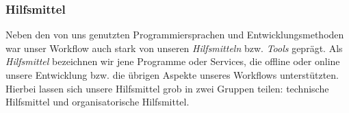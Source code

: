 
\subsubsection{Hilfsmittel}
\label{team:orga-workflow-tools}

Neben den von uns genutzten Programmiersprachen und Entwicklungsmethoden war
unser Workflow auch stark von unseren \emph{Hilfsmitteln} bzw. \emph{Tools}
geprägt. Als \emph{Hilfsmittel} bezeichnen wir jene Programme oder Services, die
offline oder online unsere Entwicklung bzw. die übrigen Aspekte unseres
Workflows unterstützten. Hierbei lassen sich unsere Hilfsmittel grob in zwei
Gruppen teilen: technische Hilfsmittel und organisatorische Hilfsmittel.

